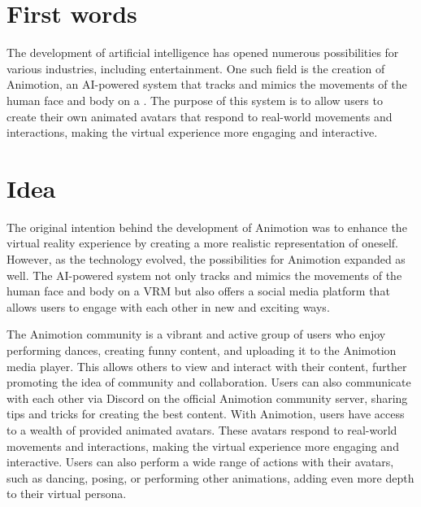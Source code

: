 \section{First words}
The development of artificial intelligence has opened numerous possibilities for various industries, including entertainment. 
One such field is the creation of Animotion, an AI-powered system that tracks and mimics the movements of the human face and 
body on a . The purpose of this system is to allow users to create their own animated avatars that 
respond to real-world movements and interactions, making the virtual experience more engaging and interactive.

\section{Idea}
The original intention behind the development of Animotion was to enhance the virtual reality experience by creating a more realistic representation of oneself. 
However, as the technology evolved, the possibilities for Animotion expanded as well. The AI-powered system not only tracks and mimics the movements of the 
human face and body on a VRM but also offers a social media platform that allows users to engage with each other in new and exciting ways.

The Animotion community is a vibrant and active group of users who enjoy performing dances, creating funny content, and uploading 
it to the Animotion media player. This allows others to view and interact with their content, further promoting the idea of community 
and collaboration. Users can also communicate with each other via Discord on the official Animotion community server, 
sharing tips and tricks for creating the best content. With Animotion, users have access to a wealth of provided animated avatars. These avatars 
respond to real-world movements and interactions, making the virtual experience more engaging and interactive. Users can 
also perform a wide range of actions with their avatars, such as dancing, posing, or performing other animations, 
adding even more depth to their virtual persona.

